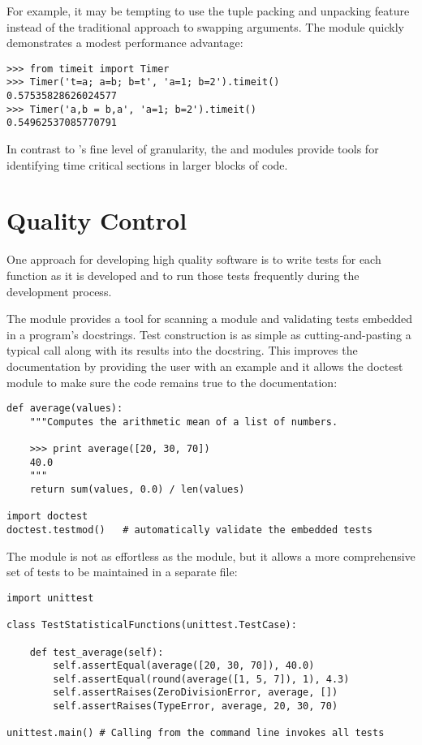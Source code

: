 \documentclass{manual}
\begin{document}
For example, it may be tempting to use the tuple packing and unpacking
feature instead of the traditional approach to swapping arguments.
The  module
quickly demonstrates a modest performance advantage:

\begin{verbatim}
>>> from timeit import Timer
>>> Timer('t=a; a=b; b=t', 'a=1; b=2').timeit()
0.57535828626024577
>>> Timer('a,b = b,a', 'a=1; b=2').timeit()
0.54962537085770791
\end{verbatim}

In contrast to 's fine level of granularity, the
 and 
modules provide tools for identifying time critical sections in larger blocks
of code.


\section{Quality Control\label{quality-control}}

One approach for developing high quality software is to write tests for
each function as it is developed and to run those tests frequently during
the development process.

The  module provides
a tool for scanning a module and validating tests embedded in a program's
docstrings.  Test construction is as simple as cutting-and-pasting a
typical call along with its results into the docstring.  This improves
the documentation by providing the user with an example and it allows the
doctest module to make sure the code remains true to the documentation:

\begin{verbatim}
def average(values):
    """Computes the arithmetic mean of a list of numbers.

    >>> print average([20, 30, 70])
    40.0
    """
    return sum(values, 0.0) / len(values)

import doctest
doctest.testmod()   # automatically validate the embedded tests
\end{verbatim}

The  module is not
as effortless as the  module, but it allows a more
comprehensive set of tests to be maintained in a separate file:

\begin{verbatim}
import unittest

class TestStatisticalFunctions(unittest.TestCase):

    def test_average(self):
        self.assertEqual(average([20, 30, 70]), 40.0)
        self.assertEqual(round(average([1, 5, 7]), 1), 4.3)
        self.assertRaises(ZeroDivisionError, average, [])
        self.assertRaises(TypeError, average, 20, 30, 70)

unittest.main() # Calling from the command line invokes all tests
\end{verbatim}
\end{document}
